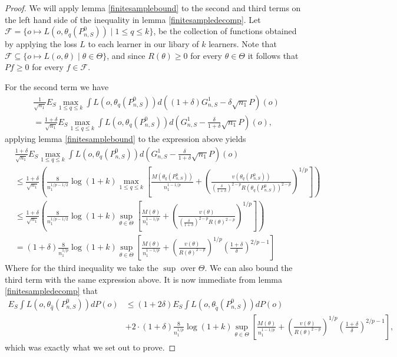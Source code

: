 \documentclass[11pt, a4paper]{article}
\theoremstyle{definition}
\theoremstyle{remark}
\newcommand{\cl}{q}
\begin{document}
\begin{proof}
    We will apply lemma \ref{finitesamplebound} to the second and third terms on the left hand side of the inequality in lemma \ref{finitesampledecomp}. Let $ \mathcal{F} = \{o \mapsto L(o, \theta_{\cl}(P_{n,S}^{0})) \mid 1 \leq \cl \leq k\}$, be the collection of functions obtained by applying the loss $ L $ to each learner in our libary of $ k $ learners. Note that $ \mathcal{F} \subseteq \{o \mapsto L(o, \theta) \mid \theta \in \Theta\} $, and since $ R(\theta) \geq 0 $ for every $ \theta \in \Theta $ it follows that $ Pf \geq 0 $ for every $ f \in \mathcal{F} $. 
   
For the second term we have 
\begin{align*}
&\frac{1}{\sqrt{n_1} } E_{S} \max_{1 \leq \cl \leq k} \int L(o, \theta_{\cl}(P_{n, S}^{0})) d ((1 + \delta) G_{n,S}^{1} - \delta \sqrt{n_1} P)(o)\\
&= 
\frac{1 + \delta}{\sqrt{n_1} } E_{S} \max_{1 \leq \cl \leq k} \int L(o, \theta_{\cl}(P_{n, S}^{0})) d (G_{n,S}^{1} - \frac{\delta }{1 + \delta} \sqrt{n_1} P)(o),
\end{align*}
applying lemma \ref{finitesamplebound} to the expression above yields 
\begin{align*}
&\frac{1 + \delta}{\sqrt{n_1} } E_{S} \max_{1 \leq \cl \leq k} \int L(o, \theta_{\cl}(P_{n, S}^{0})) d (G_{n,S}^{1} - \frac{\delta }{1 + \delta} \sqrt{n_1} P)(o) \\
&\leq  \frac{1 + \delta}{\sqrt{n_1}}\left( \frac{8}{n_1^{1/p-1/2}} \log(1 + k) \max_{1 \leq \cl \leq k} \left[ \frac{M(\theta_{\cl}(P_{n,S}^{0}))}{n_1^{1-1/p}} + \left( \frac{v(\theta_{ \cl}(P_{n,S}^0) )}{( \frac{\delta}{1 + \delta} )^{2-p} R(\theta_{\cl}(P_{n,S}^{0}))^{2-p}} \right)^{1/p} \right] \right)\\
&\leq  \frac{1 + \delta}{\sqrt{n_1}}\left( \frac{8}{n_1^{1/p-1/2}} \log(1 + k) \sup_{\theta \in \Theta} \left[ \frac{M(\theta)}{n_1^{1-1/p}} + \left( \frac{v(\theta)}{( \frac{\delta}{1 + \delta} )^{2-p} R(\theta)^{2-p}} \right)^{1/p} \right] \right)\\
&= (1 + \delta) \frac{8}{n_1^{1/p}} \log(1 + k) \sup_{\theta \in \Theta} \left[ \frac{M(\theta)}{n_1^{1-1/p}} + \left( \frac{v(\theta)}{R(\theta)^{2-p}} \right)^{1/p}\left( \frac{1 + \delta}{\delta}  \right)^{2/p-1} \right]  
\end{align*}
Where for the third inequality we take the $ \sup $ over $ \Theta $. We can also bound the third term with the same expression above. It is now immediate from lemma \ref{finitesampledecomp} that 
\begin{align*}
    E_{S} \int L(o, \theta_{ \hat{\cl} }(P_{n, S}^{0})) d P(o) &\leq (1 + 2 \delta) E_{S} \int L(o, \theta_{ \tilde{\cl} }(P_{n, S}^{0})) d P(o) \\
                                                               &+ 2 \cdot (1 + \delta) \frac{8}{n_1^{1/p}} \log(1 + k) \sup_{\theta \in \Theta} \left[ \frac{M(\theta)}{n_1^{1-1/p}} + \left( \frac{v(\theta)}{R(\theta)^{2-p}} \right)^{1/p}\left( \frac{1 + \delta}{\delta}  \right)^{2/p-1} \right],
\end{align*}
which was exactly what we set out to prove. 
\end{proof}
\end{document}
